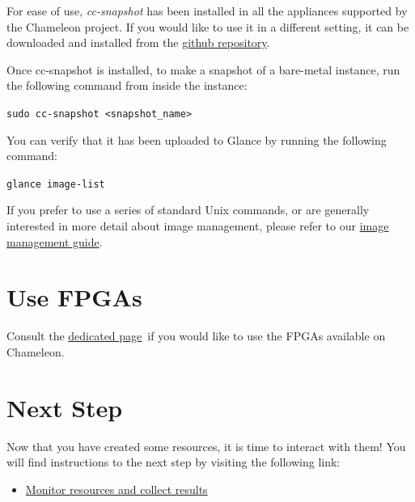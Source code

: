 {For ease of use, \emph{cc-snapshot} has been installed in all the
appliances supported by the Chameleon project. If you would like to use
it in a different setting, it can be downloaded and installed from the
\href{https://github.com/ChameleonCloud/ChameleonSnapshotting}{github
repository}.}

{Once cc-snapshot is installed, to make a snapshot of a bare-metal
instance, run the following command from inside the instance:}

{\texttt{sudo\ cc-snapshot\ \textless{}snapshot\_name\textgreater{}}}

{You can verify that it has been uploaded to Glance by running the
following command:}

{\texttt{glance\ image-list}}

{If you prefer to use a series of standard Unix commands, or are
generally interested in more detail about image management, please refer
to our
\href{https://www.chameleoncloud.org/docs/user-guides/ironic/\#snapshotting_an_instance}{image
management guide}.}

\section{Use FPGAs}

Consult the
\href{https://www.chameleoncloud.org/docs/bare-metal-user-guide/fpga/}{dedicated
page}~if you would like to use the FPGAs available on Chameleon.

\section{Next Step}

Now that you have created some resources, it is time to interact with
them! You will find instructions to the next step by visiting the
following link:

\begin{itemize}
\tightlist
\item
  \href{https://www.chameleoncloud.org/monitor-and-collect/}{Monitor
  resources and collect results}
\end{itemize}

